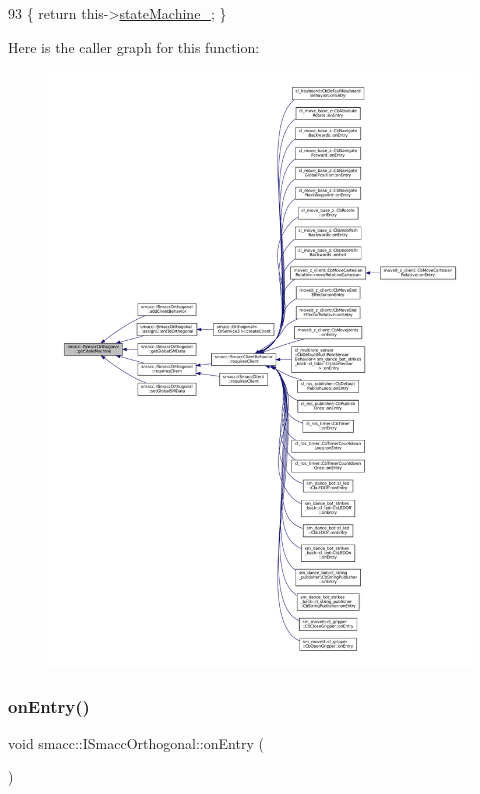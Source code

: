 \begin{DoxyCode}
93 \{ \textcolor{keywordflow}{return} this->\hyperlink{classsmacc_1_1ISmaccOrthogonal_a418b2e094a65013444ec1fca7e94f28d}{stateMachine\_}; \}
\end{DoxyCode}
Here is the caller graph for this function\+:
\nopagebreak
\begin{figure}[H]
\begin{center}
\leavevmode
\includegraphics[width=350pt]{classsmacc_1_1ISmaccOrthogonal_aae265ec480b8ed552ddc79afd2d93a62_icgraph}
\end{center}
\end{figure}
\mbox{\label{classsmacc_1_1ISmaccOrthogonal_a35f4d2955445dc1a4b2dafbca2f0bd16}} 
\subsubsection{\texorpdfstring{on\+Entry()}{onEntry()}}
{\footnotesize\ttfamily void smacc\+::\+I\+Smacc\+Orthogonal\+::on\+Entry (\begin{DoxyParamCaption}{ }\end{DoxyParamCaption})}



